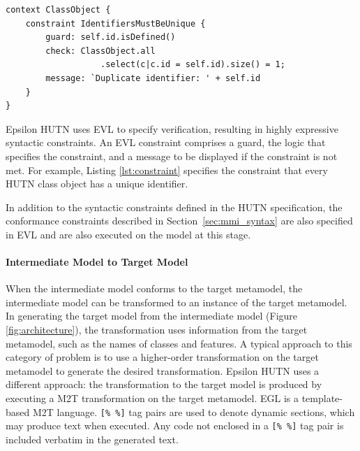 \begin{lstlisting}[caption=A constraint (in EVL) to check that all identifiers are unique., label=lst:constraint, language=EVL]
context ClassObject {
    constraint IdentifiersMustBeUnique {
        guard: self.id.isDefined()
        check: ClassObject.all
                   .select(c|c.id = self.id).size() = 1;
        message: `Duplicate identifier: ' + self.id
    }
}
\end{lstlisting}

Epsilon HUTN uses EVL \cite{kolovos08evl} to specify verification, resulting in highly expressive syntactic constraints. An EVL constraint comprises a guard, the logic that specifies the constraint, and a message to be displayed if the constraint is not met. For example, Listing \ref{lst:constraint} specifies the constraint that every HUTN class object has a unique identifier.

In addition to the syntactic constraints defined in the HUTN specification, the conformance constraints described in Section~\ref{sec:mmi_syntax} are also specified in EVL and are also executed on the model at this stage.

\paragraph{Intermediate Model to Target Model}
When the intermediate model conforms to the target metamodel, the intermediate model can be transformed to an instance of the target metamodel. In generating the target model from the intermediate model (Figure \ref{fig:architecture}), the transformation uses information from the target metamodel, such as the names of classes and features. A typical approach to this category of problem is to use a higher-order transformation on the target metamodel to generate the desired transformation. Epsilon HUTN uses a different approach: the transformation to the target model is produced by executing a M2T transformation on the target metamodel. EGL \cite{rose08egl} is a template-based M2T language. \verb|[% %]| tag pairs are used to denote dynamic sections, which may produce text when executed. Any code not enclosed in a \verb|[% %]| tag pair is included verbatim in the generated text.


